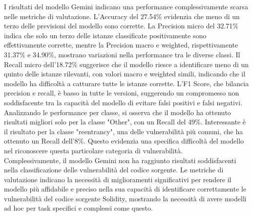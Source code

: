 \documentclass[../../Thesis.tex]{subfiles}
\begin{document}
    I risultati del modello Gemini indicano una performance complessivamente scarsa nelle metriche di valutazione. L'Accuracy del 27.54\% evidenzia che meno di un terzo delle previsioni del modello sono corrette. La Precision micro del 32.71\% indica che solo un terzo delle istanze classificate positivamente sono effettivamente corrette, mentre la Precision macro e weighted, rispettivamente 31.37\% e 34.90\%, mostrano variazioni nella performance tra le diverse classi. Il Recall micro dell'18.72\% suggerisce che il modello riesce a identificare meno di un quinto delle istanze rilevanti, con valori macro e weighted simili, indicando che il modello ha difficoltà a catturare tutte le istanze corrette. L'F1 Score, che bilancia precision e recall, è basso in tutte le versioni, suggerendo un compromesso non soddisfacente tra la capacità del modello di evitare falsi positivi e falsi negativi.\\
    Analizzando le performance per classe, si osserva che il modello ha ottenuto risultati migliori solo per la classe "Other", con un Recall del 49\%. Interessante è il risultato per la classe "reentrancy", una delle vulnerabilità più comuni, che ha ottenuto un Recall dell'8\%. Questo evidenzia una specifica difficoltà del modello nel riconoscere questa particolare categoria di vulnerabilità.\\
    Complessivamente, il modello Gemini non ha raggiunto risultati soddisfacenti nella classificazione delle vulnerabilità del codice sorgente. Le metriche di valutazione indicano la necessità di miglioramenti significativi per rendere il modello più affidabile e preciso nella sua capacità di identificare correttamente le vulnerabilità del codice sorgente Solidity, mostrando la necessità di avere modelli ad hoc per task specifici e complessi come questo.
\end{document}
